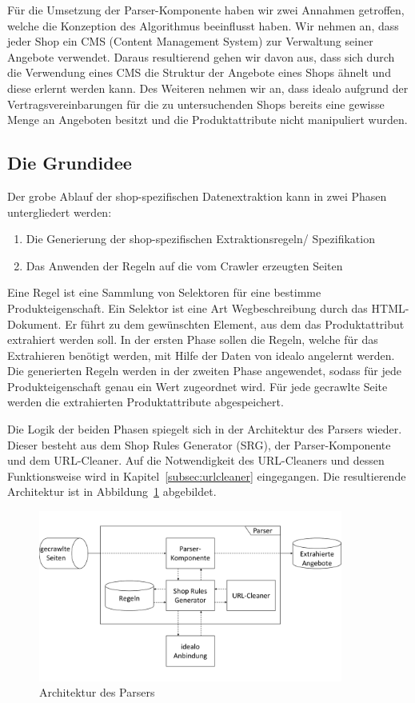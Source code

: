Für die Umsetzung der Parser-Komponente haben wir zwei Annahmen getroffen, welche die Konzeption des Algorithmus
beeinflusst haben.
Wir nehmen an, dass jeder Shop ein CMS (Content Management System) zur Verwaltung seiner Angebote verwendet.
Daraus resultierend gehen wir davon aus, dass sich durch die Verwendung eines CMS die Struktur der Angebote eines Shops
ähnelt und diese erlernt werden kann.
Des Weiteren nehmen wir an, dass idealo aufgrund der Vertragsvereinbarungen für die zu untersuchenden Shops bereits
eine gewisse Menge an Angeboten besitzt und die Produktattribute nicht manipuliert wurden.

\subsection{Die Grundidee}
\label{subsec:grundidee}

Der grobe Ablauf der shop-spezifischen Datenextraktion kann in zwei Phasen untergliedert werden:
\begin{enumerate}
    \item Die Generierung der shop-spezifischen Extraktionsregeln/ Spezifikation
    \item Das Anwenden der Regeln auf die vom Crawler erzeugten Seiten
\end{enumerate}
Eine Regel ist eine Sammlung von Selektoren für eine bestimme Produkteigenschaft.
Ein Selektor ist eine Art Wegbeschreibung durch das HTML-Dokument.
Er führt zu dem gewünschten Element, aus dem das Produktattribut extrahiert werden soll.
In der ersten Phase sollen die Regeln, welche für das Extrahieren benötigt werden, mit Hilfe der Daten von idealo
angelernt werden.
Die generierten Regeln werden in der zweiten Phase angewendet, sodass für jede Produkteigenschaft genau ein Wert
zugeordnet wird.
Für jede gecrawlte Seite werden die extrahierten Produktattribute abgespeichert.

Die Logik der beiden Phasen spiegelt sich in der Architektur des Parsers wieder.
Dieser besteht aus dem Shop Rules Generator (SRG), der Parser-Komponente und dem URL-Cleaner.
Auf die Notwendigkeit des URL-Cleaners und dessen Funktionsweise wird in Kapitel~\ref{subsec:urlcleaner} eingegangen.
Die resultierende Architektur ist in Abbildung~\ref{abb:architektur-parser} abgebildet.

\begin{figure}[H]
    \centering
    \includegraphics[width=10cm, trim=0 1.7cm 0 1.7cm, clip]{resources/Architektur-Parser.pdf}
    \caption{Architektur des Parsers}
    \label{abb:architektur-parser}
\end{figure}

